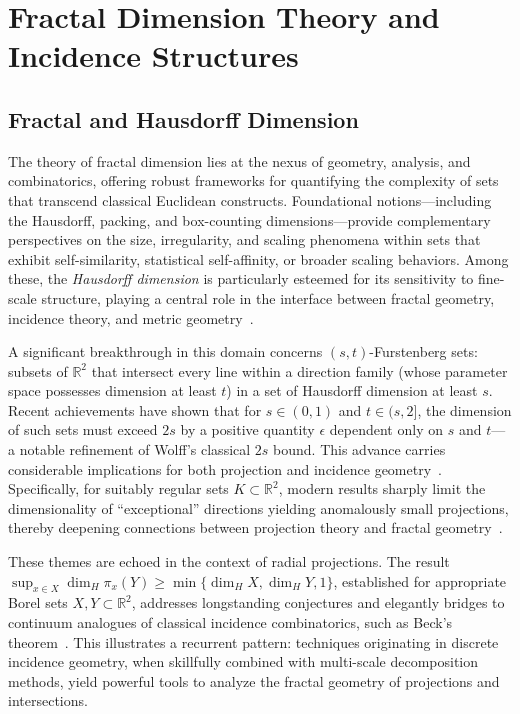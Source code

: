 \documentclass[sigconf]{acmart}
\begin{document}
\section{Fractal Dimension Theory and Incidence Structures}

\subsection{Fractal and Hausdorff Dimension}

The theory of fractal dimension lies at the nexus of geometry, analysis, and combinatorics, offering robust frameworks for quantifying the complexity of sets that transcend classical Euclidean constructs. Foundational notions—including the Hausdorff, packing, and box-counting dimensions—provide complementary perspectives on the size, irregularity, and scaling phenomena within sets that exhibit self-similarity, statistical self-affinity, or broader scaling behaviors. Among these, the \emph{Hausdorff dimension} is particularly esteemed for its sensitivity to fine-scale structure, playing a central role in the interface between fractal geometry, incidence theory, and metric geometry~\cite{ref68}.

A significant breakthrough in this domain concerns $(s, t)$-Furstenberg sets: subsets of $\mathbb{R}^2$ that intersect every line within a direction family (whose parameter space possesses dimension at least $t$) in a set of Hausdorff dimension at least $s$. Recent achievements have shown that for $s \in (0,1)$ and $t\in(s,2]$, the dimension of such sets must exceed $2s$ by a positive quantity $\epsilon$ dependent only on $s$ and $t$—a notable refinement of Wolff's classical $2s$ bound. This advance carries considerable implications for both projection and incidence geometry~\cite{ref68}. Specifically, for suitably regular sets $K \subset \mathbb{R}^2$, modern results sharply limit the dimensionality of ``exceptional'' directions yielding anomalously small projections, thereby deepening connections between projection theory and fractal geometry~\cite{ref68}.

These themes are echoed in the context of radial projections. The result $\sup_{x \in X} \dim_H \pi_x(Y) \geq \min\{ \dim_H X, \dim_H Y, 1 \}$, established for appropriate Borel sets $X, Y \subset \mathbb{R}^2$, addresses longstanding conjectures and elegantly bridges to continuum analogues of classical incidence combinatorics, such as Beck's theorem~\cite{ref92}. This illustrates a recurrent pattern: techniques originating in discrete incidence geometry, when skillfully combined with multi-scale decomposition methods, yield powerful tools to analyze the fractal geometry of projections and intersections.
\end{document}

